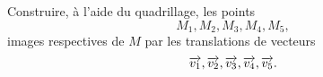 \documentclass[11pt]{article}
\begin{document}
\begin{app}
  \begin{minipage}[]{.3\textwidth}
    Construire, à l'aide du quadrillage, les points
    \[
      M_1, M_2, M_3, M_4, M_5,
    \]
    images respectives de $M$ par les translations de vecteurs
    \[
      \overrightarrow{v_1}, \overrightarrow{v_2}, \overrightarrow{v_3}, \overrightarrow{v_4}, \overrightarrow{v_5}.
    \]
  \end{minipage}
  \begin{minipage}[]{.7\textwidth}
    \begin{center}
    \end{center}
  \end{minipage}
\end{app}
\end{document}
